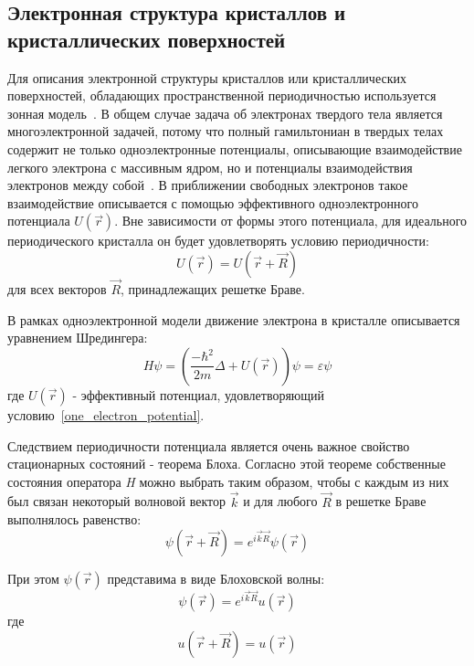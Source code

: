 \subsection{Электронная структура кристаллов и кристаллических поверхностей} \label{sect1_1_2}
Для описания электронной структуры кристаллов или кристаллических 
поверхностей, обладающих пространственной периодичностью используется
зонная модель~\cite{Kittel1976}. В общем случае задача об электронах 
твердого тела является многоэлектронной задачей, потому что полный 
гамильтониан в твердых телах содержит не только одноэлектронные 
потенциалы, описывающие взаимодействие легкого электрона с массивным 
ядром, но и потенциалы взаимодействия электронов между собой~\cite{Simonov_disser}.
В приближении свободных электронов такое взаимодействие описывается
с помощью эффективного одноэлектронного потенциала $U(\vec{r})$. 
Вне зависимости от формы этого потенциала, для идеального периодического
кристалла он будет удовлетворять условию периодичности:
\begin{equation}
	\label{one_electron_potential}
	U(\vec{r})=U(\vec{r}+\vec{R})
\end{equation}
для всех векторов $\vec{R}$, принадлежащих решетке Браве.


В рамках одноэлектронной модели движение электрона в кристалле описывается
уравнением Шредингера:
\begin{equation}
	\label{Shredinger_equation}
	H\psi=\left(\frac{-\hbar^2}{2m}\Delta+U(\vec{r})\right)\psi=\varepsilon\psi
\end{equation}
где $U(\vec{r})$ - эффективный потенциал, удовлетворяющий условию~\ref{one_electron_potential}.


Следствием периодичности потенциала является очень важное свойство 
стационарных состояний - теорема Блоха. Согласно этой теореме 
собственные состояния оператора \textit{H} можно выбрать таким образом,
чтобы с каждым из них был связан некоторый волновой вектор $\vec{k}$ и 
для любого $\vec{R}$ в решетке Браве выполнялось равенство:
\begin{equation}
	\label{equaliation_of_wave_func}
	\psi(\vec{r}+\vec{R})=e^{i\vec{k}\vec{R}}\psi(\vec{r})
\end{equation}


При этом $\psi(\vec{r})$ представима в виде Блоховской волны:
\begin{equation}
	\label{Bloh_wave}
	\psi(\vec{r})=e^{i\vec{k}\vec{R}}u(\vec{r})
\end{equation}
где
\begin{equation}
	\label{u_wave}
	u(\vec{r}+\vec{R})=u(\vec{r})
\end{equation}


